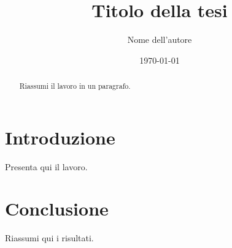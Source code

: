 \documentclass[12pt]{report}
\title{Titolo della tesi}
\author{Nome dell'autore}
\date{\today}
\begin{document}
\maketitle

\begin{abstract}
Riassumi il lavoro in un paragrafo.
\end{abstract}

\tableofcontents

\chapter{Introduzione}
Presenta qui il lavoro.

\chapter{Conclusione}
Riassumi qui i risultati.
\end{document}
